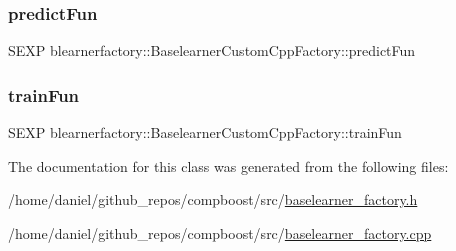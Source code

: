\subsubsection{\texorpdfstring{predict\+Fun}{predictFun}}
{\footnotesize\ttfamily S\+E\+XP blearnerfactory\+::\+Baselearner\+Custom\+Cpp\+Factory\+::predict\+Fun\hspace{0.3cm}{\ttfamily [private]}}

\mbox{\label{classblearnerfactory_1_1_baselearner_custom_cpp_factory_a8b36c04fdd1532ee53a1970f35641c05}} 
\subsubsection{\texorpdfstring{train\+Fun}{trainFun}}
{\footnotesize\ttfamily S\+E\+XP blearnerfactory\+::\+Baselearner\+Custom\+Cpp\+Factory\+::train\+Fun\hspace{0.3cm}{\ttfamily [private]}}



The documentation for this class was generated from the following files\+:\begin{DoxyCompactItemize}
\item 
/home/daniel/github\+\_\+repos/compboost/src/\hyperlink{baselearner__factory_8h}{baselearner\+\_\+factory.\+h}\item 
/home/daniel/github\+\_\+repos/compboost/src/\hyperlink{baselearner__factory_8cpp}{baselearner\+\_\+factory.\+cpp}\end{DoxyCompactItemize}

